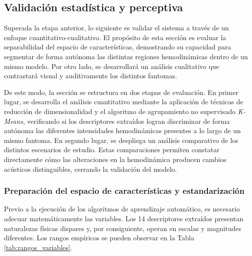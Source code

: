 
\subsection{Validación estadística y perceptiva}

Superada la etapa anterior, lo siguiente es validar el sistema a través de un enfoque cuantitativo-cualitativo. El propósito de esta sección es evaluar la separabilidad del espacio de características, demostrando su capacidad para segmentar de forma autónoma las distintas regiones hemodinámicas dentro de un mismo modelo. Por otro lado, se desarrollará un análisis cualitativo que contrastará visual y auditivamente los distintos fantomas.

De este modo, la sección se estructura en dos etapas de evaluación. En primer lugar, se desarrolla el análisis cuantitativo mediante la aplicación de técnicas de reducción de dimensionalidad y el algoritmo de agrupamiento no supervisado \textit{K-Means}, verificando si los descriptores extraídos logran discriminar de forma autónoma las diferentes intensidades hemodinámicas presentes a lo largo de un mismo fantoma. En segundo lugar, se despliega un análisis comparativo de los distintos escenarios de estudio. Estas comparaciones permiten constatar directamente cómo las alteraciones en la hemodinámica producen cambios acústicos distinguibles, cerrando la validación del modelo.

\subsubsection{Preparación del espacio de características y estandarización}

Previo a la ejecución de los algoritmos de aprendizaje automático, es necesario adecuar matemáticamente las variables. Los 14 descriptores extraídos presentan naturalezas físicas dispares y, por consiguiente, operan en escalas y magnitudes diferentes. Los rangos empíricos se pueden observar en la Tabla \ref{tab:rangos_variables}.

